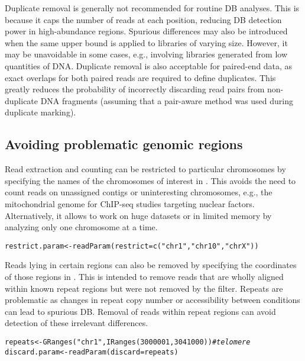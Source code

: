 \documentclass{report}\usepackage[]{graphicx}\usepackage[usenames,dvipsnames]{color}
\newcommand{\hlnum}[1]{\textcolor[rgb]{0.816,0.125,0.439}{#1}}%
\newcommand{\hlstr}[1]{\textcolor[rgb]{0.251,0.627,0.251}{#1}}%
\newcommand{\hlcom}[1]{\textcolor[rgb]{0.502,0.502,0.502}{\textit{#1}}}%
\newcommand{\hlstd}[1]{\textcolor[rgb]{0.251,0.251,0.251}{#1}}%
\newcommand{\hlkwb}[1]{\textcolor[rgb]{0,0,0}{#1}}%
\newcommand{\hlkwc}[1]{\textcolor[rgb]{0.251,0.251,0.251}{#1}}%
\newcommand{\hlkwd}[1]{\textcolor[rgb]{0.878,0.439,0.125}{#1}}%
\newenvironment{knitrout}{}{} %
\begin{document}
Duplicate removal is generally not recommended for routine DB analyses. 
This is because it caps the number of reads at each position, reducing DB detection power in high-abundance regions. 
Spurious differences may also be introduced when the same upper bound is applied to libraries of varying size. 
However, it may be unavoidable in some cases, e.g., involving libraries generated from low quantities of DNA.
Duplicate removal is also acceptable for paired-end data, as exact overlaps for both paired reads are required to define duplicates.
This greatly reduces the probability of incorrectly discarding read pairs from non-duplicate DNA fragments
(assuming that a pair-aware method was used during duplicate marking).

\subsection{Avoiding problematic genomic regions}
Read extraction and counting can be restricted to particular chromosomes by specifying the names of the chromosomes of interest in . 
This avoids the need to count reads on unassigned contigs or uninteresting chromosomes, e.g., the mitochondrial genome for ChIP-seq studies targeting nuclear factors. 
Alternatively, it allows  to work on huge datasets or in limited memory by analyzing only one chromosome at a time.

\begin{knitrout}
\color{fgcolor}\begin{kframe}
\begin{alltt}
\hlstd{restrict.param} \hlkwb{<-} \hlkwd{readParam}\hlstd{(}\hlkwc{restrict}\hlstd{=}\hlkwd{c}\hlstd{(}\hlstr{"chr1"}\hlstd{,} \hlstr{"chr10"}\hlstd{,} \hlstr{"chrX"}\hlstd{))}
\end{alltt}
\end{kframe}
\end{knitrout}

Reads lying in certain regions can also be removed by specifying the coordinates of those regions in . 
This is intended to remove reads that are wholly aligned within known repeat regions but were not removed by the  filter. 
Repeats are problematic as changes in repeat copy number or accessibility between conditions can lead to spurious DB. 
Removal of reads within repeat regions can avoid detection of these irrelevant differences. 

\begin{knitrout}
\color{fgcolor}\begin{kframe}
\begin{alltt}
\hlstd{repeats} \hlkwb{<-} \hlkwd{GRanges}\hlstd{(}\hlstr{"chr1"}\hlstd{,} \hlkwd{IRanges}\hlstd{(}\hlnum{3000001}\hlstd{,} \hlnum{3041000}\hlstd{))} \hlcom{# telomere}
\hlstd{discard.param} \hlkwb{<-} \hlkwd{readParam}\hlstd{(}\hlkwc{discard}\hlstd{=repeats)}
\end{alltt}
\end{kframe}
\end{knitrout}
\end{document}
